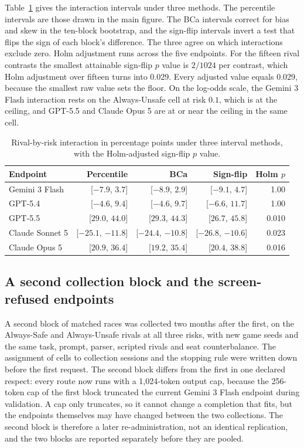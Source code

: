 \documentclass{article}
\begin{document}
Table~\ref{tab:interaction-intervals} gives the interaction intervals under
three methods. The percentile intervals are those drawn in the main figure. The
BCa intervals correct for bias and skew in the ten-block bootstrap, and the
sign-flip intervals invert a test that flips the sign of each block's
difference. The three agree on which interactions exclude zero. Holm adjustment
runs across the five endpoints. For the fifteen rival contrasts the smallest
attainable sign-flip $p$ value is $2/1024$ per contrast, which Holm adjustment
over fifteen turns into 0.029. Every adjusted value equals 0.029, because the
smallest raw value sets the floor. On the log-odds
scale, the Gemini 3 Flash interaction rests on the Always-Unsafe cell at risk
$0.1$, which is at the ceiling, and GPT-5.5 and Claude Opus 5 are at or near the
ceiling in the same cell.

\begin{table}[t]
\caption{Rival-by-risk interaction in percentage points under three interval
methods, with the Holm-adjusted sign-flip $p$ value.}
\label{tab:interaction-intervals}
\centering
\footnotesize
\setlength{\tabcolsep}{3pt}
\begin{tabular}{@{}lrrrr@{}}
\toprule
Endpoint & Percentile & BCa & Sign-flip & Holm $p$ \\
\midrule
Gemini 3 Flash  & [$-7.9$, $3.7$] & [$-8.9$, $2.9$] & [$-9.1$, $4.7$] & 1.00 \\
GPT-5.4         & [$-4.6$, $9.4$] & [$-4.6$, $9.7$] & [$-6.6$, $11.7$] & 1.00 \\
GPT-5.5         & [$29.0$, $44.0$] & [$29.3$, $44.3$] & [$26.7$, $45.8$] & 0.010 \\
Claude Sonnet 5 & [$-25.1$, $-11.8$] & [$-24.4$, $-10.8$] & [$-26.8$, $-10.6$] & 0.023 \\
Claude Opus 5   & [$20.9$, $36.4$] & [$19.2$, $35.4$] & [$20.4$, $38.8$] & 0.016 \\
\bottomrule
\end{tabular}
\end{table}

\subsection{A second collection block and the screen-refused endpoints}
\label{sec:supp-replication}

A second block of matched races was collected two months after the first, on
the Always-Safe and Always-Unsafe rivals at all three risks, with new game
seeds and the same task, prompt, parser, scripted rivals and seat
counterbalance. The assignment of cells to collection sessions and the stopping
rule were written down before the first request. The second block differs from
the first in one declared respect: every route now runs with a 1{,}024-token
output cap, because the 256-token cap of the first block truncated the current
Gemini 3 Flash endpoint during validation. A cap only truncates, so it cannot
change a completion that fits, but the endpoints themselves may have changed
between the two collections. The second block is therefore a later
re-administration, not an identical replication, and the two blocks are
reported separately before they are pooled.
\end{document}

